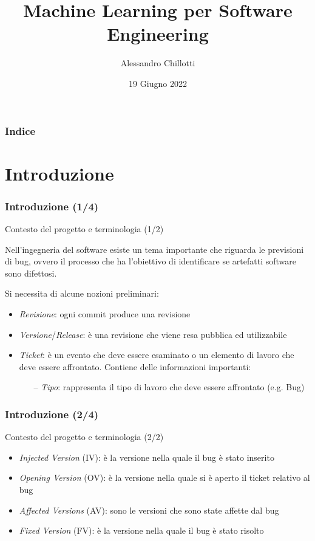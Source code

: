 \documentclass[
	usepdftitle=false,
	xcolor={table, dvipsnames},
	hyperref={
		pdftitle={Machine Learning per Software Engineering},
    	pdfauthor={Alessando Chillotti}
    }
]{beamer}
\title[Progetto ISW2]{Machine Learning per Software Engineering}
\author{Alessandro Chillotti}
\institute[]{Università degli studi di Roma Tor Vergata}
\date{19 Giugno 2022}
\begin{document}
\beamertemplatenavigationsymbolsempty
{}

\begin{frame}
\titlepage
\end{frame}

\begin{frame}
\frametitle{Indice}
\tableofcontents
\end{frame}

\section{Introduzione}
\begin{frame}
\frametitle{Introduzione (1/4)}
\begin{block}{Contesto del progetto e terminologia (1/2)}

Nell'ingegneria del software esiste un tema importante che riguarda le previsioni di bug, ovvero il processo che ha l'obiettivo di identificare se artefatti software sono difettosi. 

Si necessita di alcune nozioni preliminari:
\begin{itemize}
\item \textit{Revisione}: ogni commit produce una revisione
\item \textit{Versione}/\textit{Release}: è una revisione che viene resa pubblica ed utilizzabile
\item \textit{Ticket}: è un evento che deve essere esaminato o un elemento di lavoro che deve essere affrontato. Contiene delle informazioni importanti:

\begin{itemize}
\item[--] \textit{Tipo}: rappresenta il tipo di lavoro che deve essere affrontato (e.g. Bug)
\end{itemize}
\end{itemize}
\end{block}
\end{frame}

\begin{frame}
\frametitle{Introduzione (2/4)}
\begin{block}{Contesto del progetto e terminologia (2/2)}
\begin{itemize}
\item \textit{Injected Version} (IV): è la versione nella quale il bug è stato inserito
\item \textit{Opening Version} (OV): è la versione nella quale si è aperto il ticket relativo al bug
\item \textit{Affected Versions} (AV): sono le versioni che sono state affette dal bug
\item \textit{Fixed Version} (FV): è la versione nella quale il bug è stato risolto
\end{itemize}
\end{block}
\end{frame}
\end{document}
